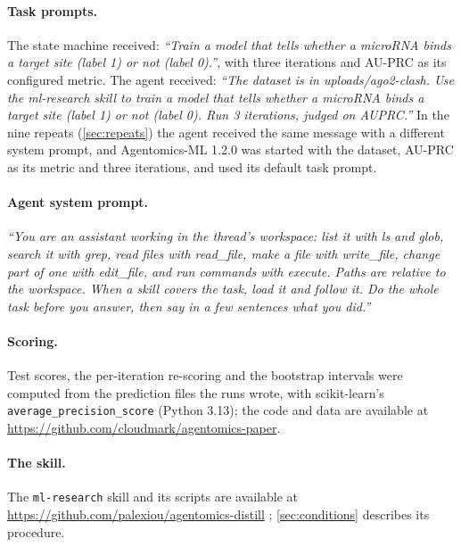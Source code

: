 \paragraph{Task prompts.} The state machine received: \emph{``Train a model that tells whether a microRNA binds a target
site (label 1) or not (label 0).''}, with three iterations and AU-PRC as its configured metric. The agent received:
\emph{``The dataset is in uploads/ago2-clash. Use the ml-research skill to train a model that tells whether a microRNA
binds a target site (label 1) or not (label 0). Run 3 iterations, judged on AUPRC.''} In the nine repeats
(\cref{sec:repeats}) the agent received the same message with a different system prompt, and Agentomics-ML 1.2.0 was
started with the dataset, AU-PRC as its metric and three iterations, and used its default task prompt.

\paragraph{Agent system prompt.} \emph{``You are an assistant working in the thread's workspace: list it with ls and glob,
search it with grep, read files with read\_file, make a file with write\_file, change part of one with edit\_file, and
run commands with execute. Paths are relative to the workspace. When a skill covers the task, load it and follow it. Do
the whole task before you answer, then say in a few sentences what you did.''}

\paragraph{Scoring.} Test scores, the per-iteration re-scoring and the bootstrap intervals were computed from the
prediction files the runs wrote, with scikit-learn's \texttt{average\_precision\_score} (Python 3.13); the code and
data are available at \url{https://github.com/cloudmark/agentomics-paper}.

\paragraph{The skill.} The \texttt{ml-research} skill and its scripts are available at
\url{https://github.com/palexiou/agentomics-distill} \citep{alexiou2025distill}; \cref{sec:conditions} describes its
procedure.
